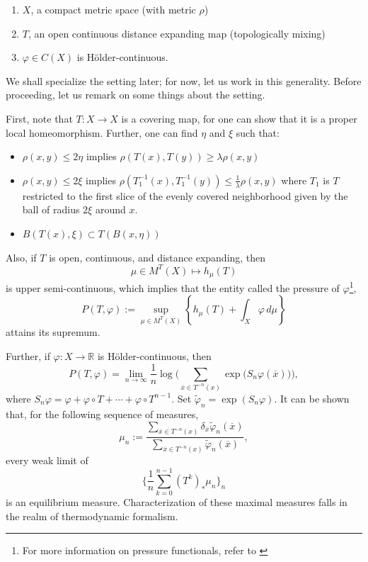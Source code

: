\documentclass[11pt,a4paper]{article}
\begin{document}
\begin{enumerate}
    \item $X$, a compact metric space (with metric $\rho$)
    \item $T$, an open continuous distance expanding map (topologically mixing)
    \item $\varphi\in C(X)$ is H\"older-continuous.
\end{enumerate}
We shall specialize the setting later; for now, let us work in this
generality. Before proceeding, let us remark on some things about the setting.

First, note that $T:X \rightarrow X$ is a covering map, for one can show that
it is a proper local homeomorphism. Further, one can find $\eta$ and $\xi$
such that:
\begin{itemize}
    \item $\rho(x, y)\leq 2\eta$ implies $\rho(T(x), T(y)) \geq \lambda\rho(x, y)$
    \item $\rho(x, y)\leq 2\xi$ implies $\rho(T_1^{-1}(x), T_1^{-1}(y)) \leq \frac{1}{\lambda}\rho(x, y)$ where $T_1$ is $T$ restricted to the first slice of the evenly covered neighborhood given by the ball of radius $2\xi$ around $x$.
    \item $B(T(x), \xi) \subset T(B(x, \eta))$
\end{itemize}

Also, if $T$ is open, continuous, and distance expanding, then
\[
\mu\in M^T(X)\longmapsto h_{\mu}(T)
\]
is upper semi-continuous, which implies that the entity called the pressure of
$\varphi$\footnote{For more information on pressure functionals, refer to
\cite{viana2016foundations}},
\[
P(T,\varphi):=\sup_{\mu\in M^T(X)}
\left\{h_{\mu}(T)+\int_X\varphi\,d\mu\right\}
\]
attains its supremum.

Further, if $\varphi:X\to\mathbb R$ is H\"older-continuous, then
\[
P(T,\varphi)=\lim_{n\to\infty}\frac1n
\log\Bigg(\sum_{\overline x\in T^{-n}(x)}
\exp\big(S_n\varphi(\overline x)\big)\Bigg),
\]
where $S_n\varphi=\varphi+\varphi\circ T+\cdots+\varphi\circ T^{n-1}$. Set $\widetilde\varphi_n=\exp(S_n\varphi)$. It can be shown that, for the following sequence of measures,
\[
\mu_n:=
\frac{\displaystyle\sum_{\overline x\in T^{-n}(x)}
\delta_{\overline x}\widetilde\varphi_n(\overline x)}
{\displaystyle\sum_{\overline x\in T^{-n}(x)}
\widetilde\varphi_n(\overline x)},
\]
every weak limit of
\[
\Bigg\{\frac1n\sum_{k=0}^{n-1}(T^k)_*\mu_n\Bigg\}_n
\]
is an equilibrium measure. Characterization of these maximal measures falls in the realm of thermodynamic formalism.
\end{document}
